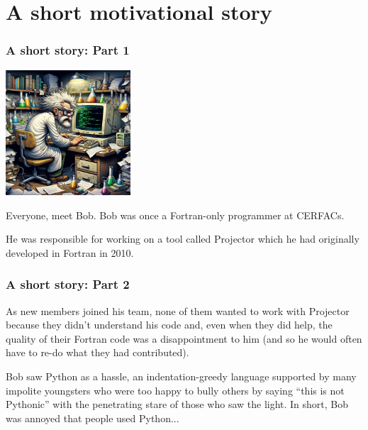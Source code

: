 \documentclass[
    xcolor={svgnames,dvipsnames},
    hyperref={colorlinks, citecolor=DeepPink4, linkcolor=DarkRed, urlcolor=DarkBlue}
]{beamer}  %
\newcommand{\1}{\mathbbm 1}
\begin{document}
\section{A short motivational story}
\begin{frame}
    \frametitle{A short story: Part 1}

    \begin{center}
        \includegraphics[width=0.35\textwidth]{bob.png}
    \end{center}

    Everyone, meet Bob. Bob was once a Fortran-only programmer at CERFACs.

    He was responsible for working on a tool called Projector which he had
    originally developed in Fortran in 2010.

\end{frame}

\begin{frame}
    \frametitle{A short story: Part 2}

    As new members joined his team, none of them wanted to work with Projector because they
    didn't understand his code and, even when they did help, the quality of their Fortran code
    was a disappointment to him (and so he would often have to re-do what they had contributed).

    Bob saw Python as a hassle, an indentation-greedy language supported by many impolite
    youngsters who were too happy to bully others by saying ``this is not Pythonic'' with the
    penetrating stare of those who saw the light. In short, Bob was annoyed that people used
    Python...

\end{frame}
\end{document}
